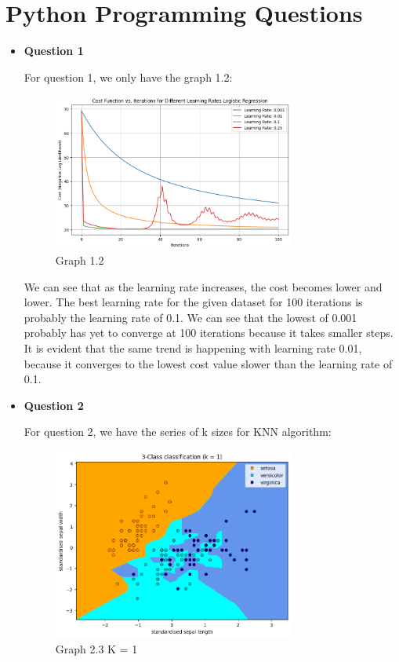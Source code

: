 \documentclass[12pt]{article}
\begin{document}
\section{Python Programming Questions}


\begin{itemize} 
  \item \textbf{Question 1}
  
  For question 1, we only have the graph 1.2: 

  \begin{figure}[H]
    \centering
    \includegraphics[width=0.75\textwidth]{1_2.png}
    \caption{Graph 1.2}
    \label{fig:graph1.2}
  \end{figure}

  We can see that as the learning rate increases, the cost becomes lower and lower. The best learning rate for the given dataset for 100 iterations is probably the learning rate of 0.1. We can see that the lowest of 0.001 probably has yet to converge at 100 iterations because it takes smaller steps. It is evident that the same trend is happening with learning rate 0.01, because it converges to the lowest cost value slower than the learning rate of 0.1.


  \item \textbf{Question 2}
  
  For question 2, we have the series of k sizes for KNN algorithm: 

  \begin{figure}[H]
    \centering
    \includegraphics[width=0.75\textwidth]{2_3_k1.png}
    \caption{Graph 2.3 K = 1}
    \label{fig:graph2.3_k1}
  \end{figure}


\end{itemize}
\end{document}
